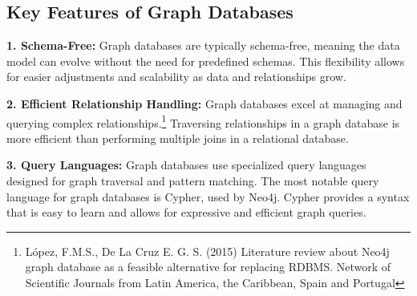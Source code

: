 \subsection{Key Features of Graph Databases}

\textbf{1. Schema-Free:} Graph databases are typically schema-free, meaning the data model can evolve without the need for predefined schemas. This flexibility allows for easier adjustments and scalability as data and relationships grow.

\textbf{2. Efficient Relationship Handling:} Graph databases excel at managing and querying complex relationships.\footnote{López, F.M.S., De La Cruz E. G. S. (2015) Literature review about Neo4j graph database as a feasible alternative for replacing RDBMS. Network of Scientific Journals from Latin America, the Caribbean, Spain and Portugal} Traversing relationships in a graph database is more efficient than performing multiple joins in a relational database.

\textbf{3. Query Languages:} Graph databases use specialized query languages designed for graph traversal and pattern matching. The most notable query language for graph databases is Cypher, used by Neo4j. Cypher provides a syntax that is easy to learn and allows for expressive and efficient graph queries.






